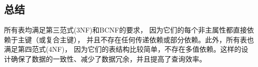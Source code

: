 \documentclass{ctexart}
\begin{document}
\subsection{总结}
所有表均满足第三范式(3NF)和BCNF的要求，
因为它们的每个非主属性都直接依赖于主键（或复合主键），
并且不存在任何传递依赖或部分依赖。此外，所有表也满足第四范式(4NF)，
因为它们的表结构比较简单，不存在多值依赖。这样的设计确保了数据的一致性、减少了数据冗余，并且提高了查询效率。
	\section{}
	\section{}

	
\end{document}
